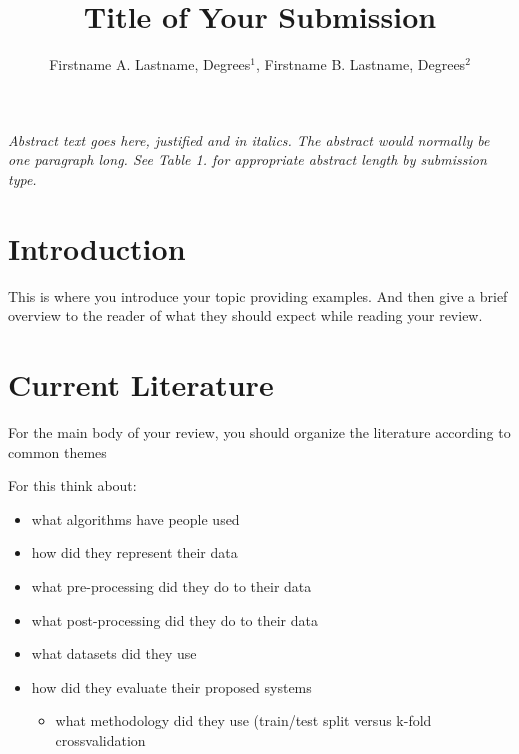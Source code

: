 \documentclass{amia}
\begin{document}
\title{Title of Your Submission}

\author{Firstname A. Lastname, Degrees$^{1}$, Firstname B. Lastname, Degrees$^{2}$}


\maketitle


\textit{Abstract text goes here, justified and in italics.  The abstract would normally be one paragraph long.  See Table 1. for appropriate abstract length by submission type.}

\section{Introduction}

This is where you introduce your topic providing examples. And then give a brief overview to the reader of what they should expect while reading your review.

\section{Current Literature} %

For the main body of your review, you should organize the literature according to common themes

For this think about: 
\begin{itemize}
    \item what algorithms have people used
    \item how did they represent their data
    \item what pre-processing did they do to their data
    \item what post-processing did they do to their data
    \item what datasets did they use
    \item how did they evaluate their proposed systems
    \begin{itemize}
        \item what methodology did they use (train/test split versus k-fold crossvalidation
        \end{itemize}
\end{itemize}
\end{document}
